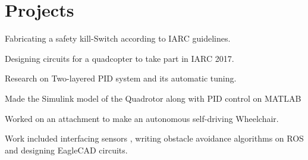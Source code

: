 \documentclass[letterpaper]{deedy-resume} %
\begin{document}
\begin{minipage}[t]{0.66\textwidth} %


\section{Projects}
\vspace{2pt}

\vspace{\topsep} %
\begin{tightitemize}
\item Fabricating a safety kill-Switch according to IARC guidelines.
\item Designing circuits for a quadcopter to take part in IARC 2017.
\item Research on Two-layered PID system and its automatic tuning.
\item Made the Simulink model of the Quadrotor along with PID control on MATLAB
\end{tightitemize}

\sectionspace %



\begin{tightitemize}
\item Worked on an attachment to make an autonomous self-driving Wheelchair.
\item Work included interfacing sensors , writing obstacle avoidance algorithms on ROS and designing EagleCAD circuits.
\end{tightitemize}

\sectionspace %



\end{minipage}
\end{document}
